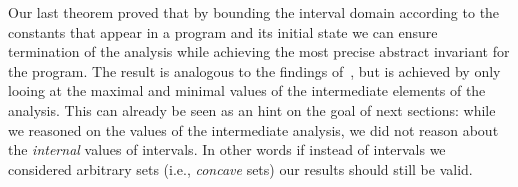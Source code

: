 

Our last theorem proved that by bounding the interval domain according
to the constants that appear in a program and its initial state we can
ensure termination of the analysis while achieving the most precise
abstract invariant for the program. The result is analogous to the
findings of~\cite{Gawlitza2009}, but is achieved by only looing at the
maximal and minimal values of the intermediate elements of the
analysis. This can already be seen as an hint on the goal of next
sections: while we reasoned on the values of the intermediate
analysis, we did not reason about the \emph{internal} values of
intervals. In other words if instead of intervals we considered
arbitrary sets (i.e., \emph{concave} sets) our results should still be
valid.
